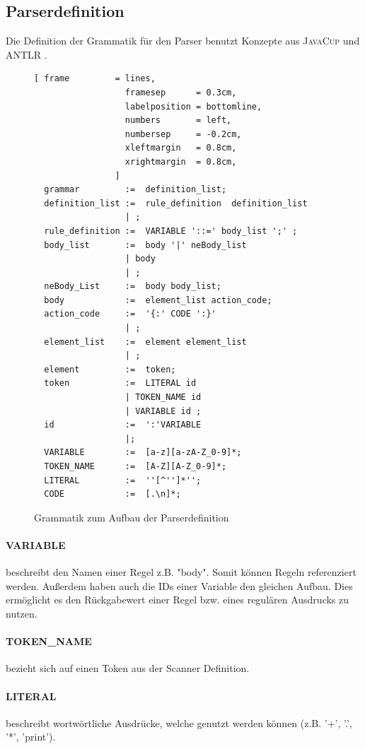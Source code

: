 \subsection{Parserdefinition}
Die Definition der Grammatik für den Parser benutzt Konzepte aus \textsc{JavaCup} und \textsc{ANTLR} .
\begin{figure}[!ht]
\begin{Verbatim}[ frame         = lines, 
                  framesep      = 0.3cm, 
                  labelposition = bottomline,
                  numbers       = left,
                  numbersep     = -0.2cm,
                  xleftmargin   = 0.8cm,
                  xrightmargin  = 0.8cm,
                ]
  grammar         :=  definition_list;
  definition_list :=  rule_definition  definition_list
	              | ;
  rule_definition :=  VARIABLE '::=' body_list ';' ;
  body_list       :=  body '|' neBody_list
	              | body
	              | ;
  neBody_List     :=  body body_list;
  body            :=  element_list action_code;
  action_code     :=  '{:' CODE ':}'
	              | ;
  element_list    :=  element element_list
	              | ;
  element         :=  token;
  token           :=  LITERAL id
	              | TOKEN_NAME id
	              | VARIABLE id ;
  id              :=  ':'VARIABLE
	              |;
  VARIABLE        :=  [a-z][a-zA-Z_0-9]*;
  TOKEN_NAME      :=  [A-Z][A-Z_0-9]*;
  LITERAL         :=  ''[^'']*'';
  CODE            :=  [.\n]*;
\end{Verbatim}
\caption{Grammatik zum Aufbau der Parserdefinition}
\label{fig:parser_grammar}
\end{figure}
\paragraph{VARIABLE} beschreibt den Namen einer Regel z.B. "body". Somit können Regeln referenziert werden.  Außerdem haben auch die IDs einer Variable den gleichen Aufbau. Dies ermöglicht es den Rückgabewert einer Regel bzw. eines regulären Ausdrucks zu nutzen.
\paragraph{TOKEN\_NAME} bezieht sich auf einen Token aus der Scanner Definition.
\paragraph{LITERAL}  beschreibt wortwörtliche Ausdrücke, welche genutzt werden können (z.B. '+', '.', '*', 'print').

